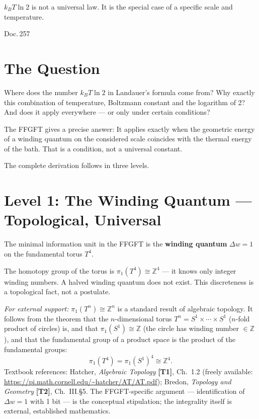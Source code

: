 \label{ch:informationseinheit_skala}

\epigraph{$k_BT\ln 2$ is not a universal law.
It is the special case of a specific scale and temperature.}{Doc.\,257}

\section{The Question}

Where does the number $k_BT\ln 2$ in Landauer's formula come from? Why
exactly this combination of temperature, Boltzmann constant and the logarithm
of 2? And does it apply everywhere --- or only under certain conditions?

The FFGFT gives a precise answer: It applies exactly when the
geometric energy of a winding quantum on the considered scale
coincides with the thermal energy of the bath. That is a
condition, not a universal constant.

The complete derivation follows in three levels. 

\section{Level 1: The Winding Quantum --- Topological, Universal}

\begin{keyresult}
The minimal information unit in the FFGFT is the \textbf{winding quantum}
$\Delta w = 1$ on the fundamental torus $T^4$.

The homotopy group of the torus is $\pi_1(T^4) \cong \mathbb{Z}^4$ ---
it knows only integer winding numbers. A halved winding quantum
does not exist. This discreteness is a topological fact,
not a postulate. 
\end{keyresult}

\textit{For external support:} $\pi_1(T^n) \cong \mathbb{Z}^n$ is a
standard result of algebraic topology. It follows from the theorem that
the $n$-dimensional torus $T^n = S^1 \times \cdots \times S^1$ ($n$-fold
product of circles) is, and that $\pi_1(S^1) \cong \mathbb{Z}$ (the
circle has winding number $\in \mathbb{Z}$), and that the fundamental group
of a product space is the product of the fundamental groups:
\[
  \pi_1(T^4) = \pi_1(S^1)^4 \cong \mathbb{Z}^4.
\]
Textbook references: Hatcher, \textit{Algebraic Topology} \textbf{[T1]},
Ch.~1.2 (freely available: \url{https://pi.math.cornell.edu/~hatcher/AT/AT.pdf});
Bredon, \textit{Topology and Geometry} \textbf{[T2]}, Ch.~III.§5.
The FFGFT-specific argument --- identification of $\Delta w = 1$ with
1 bit --- is the conceptual stipulation; the integrality itself is
external, established mathematics. 


